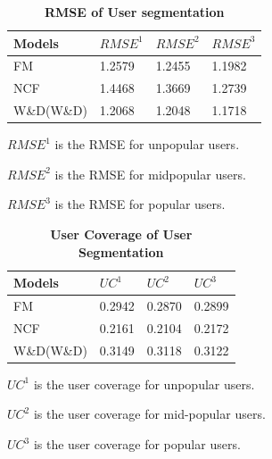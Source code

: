 \documentclass[journal]{IEEEtran}
\begin{document}
\begin{table}[!ht] %
\centering
\label{table:Exps}
\begin{tabular}{llll}
Models &  $RMSE^1$ & $RMSE^2$ & $RMSE^3$\\ \hline
FM            & 1.2579   & 1.2455    & 1.1982\\
NCF           & 1.4468   & 1.3669    & 1.2739\\
W\&D(W\&D)    & 1.2068   & 1.2048    & 1.1718\\
\end{tabular}
\caption{{\bf RMSE of User segmentation}}
\begin{tablenotes}
      \small
      \item $RMSE^1$ is the RMSE for unpopular users.
      \item $RMSE^2$ is the RMSE for midpopular users.
      \item $RMSE^3$ is the RMSE for popular users.
\end{tablenotes}
\end{table}

\bigskip
\bigskip

\begin{table}[!ht] %
\centering
\label{table:Exps}
\begin{tabular}{llll}
Models &  $UC^1$ & $UC^2$ & $UC^3$\\ \hline
FM              & 0.2942    & 0.2870    & 0.2899\\
NCF             & 0.2161    & 0.2104    & 0.2172\\
W\&D(W\&D)      & 0.3149    & 0.3118    & 0.3122\\
\end{tabular}
\caption{ {\bf User Coverage of User Segmentation}}
\begin{tablenotes}
      \small
      \item $UC^1$ is the user coverage for unpopular users.
      \item $UC^2$ is the user coverage for mid-popular users.
      \item $UC^3$ is the user coverage for popular users.
\end{tablenotes}
\end{table}

\bigskip
\bigskip
\end{document}
